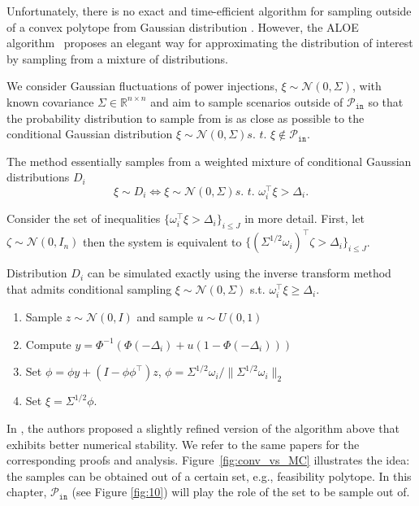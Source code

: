 Unfortunately, there is no exact and time-efficient algorithm for sampling outside of a convex polytope from Gaussian distribution \cite{khachiyan1993complexity}. However, the ALOE algorithm~\cite{owen2019importance,lukashevich2021power} proposes an elegant way for approximating the distribution of interest by sampling from a mixture of distributions. 

We consider Gaussian fluctuations of power injections, $\xi \sim \mathcal{N}(0, \Sigma)$, with known covariance $\Sigma \in \mathbb{R}^{n\times n}$ and aim to sample scenarios outside of $\mathcal{P}_{\texttt{in}}$ so that the probability distribution to sample from is as close as possible to the conditional Gaussian distribution $\xi \sim \mathcal{N}(0, \Sigma) \textit{s. t. } \xi\not\in \mathcal{P}_{\texttt{in}}$. 

The method essentially samples from a weighted mixture of conditional Gaussian distributions $D_i$ 
\[\xi \sim D_i \Longleftrightarrow \xi \sim \mathcal{N}(0, \Sigma) \textit{s. t. } \omega_i^\top \xi > \Delta_i. \]

Consider the set of inequalities $\{\omega_i^\top \xi > \Delta_i\}_{i\le J}$ in more detail. First, let $\zeta \sim \mathcal{N}(0, I_n)$ then the system is equivalent to $\{(\Sigma^{1/2}\omega_i)^\top 
\zeta > \Delta_i\}_{i\le J}$. 


Distribution $D_i$ can be simulated exactly using the inverse transform method \cite{l2009monte,morlet1983sampling} that admits conditional sampling $\xi \sim \mathcal{N}(0, \Sigma)$ s.t. $\omega_i^\top \xi \ge \Delta_i$. 
\begin{enumerate}
  \item Sample $z \sim \mathcal{N}(0, I)$ and sample $u \sim U(0,1)$
  \item Compute $y = \Phi^{-1}(\Phi(-\Delta_i) + u(1 - \Phi(-\Delta_i)))$
  \item Set $\phi = \phi y + (I - \phi\phi^\top) z$, $\phi = \Sigma^{1/2} \omega_i / \|\Sigma^{1/2} \omega_i\|_2$
  \item Set $\xi = \Sigma^{1/2} \phi$.
\end{enumerate}

In \cite{owen2019importance,lukashevich2021power}, the authors proposed a slightly refined version of the algorithm above that exhibits better numerical stability. We refer to the same papers for the corresponding proofs and analysis. Figure~\ref{fig:conv_vs_MC} illustrates the idea: the samples can be obtained out of a certain set, e.g., feasibility polytope. In this chapter, $\mathcal{P}_{\texttt{in}}$ (see Figure \ref{fig:10}) will play the role of the set to be sample out of.


